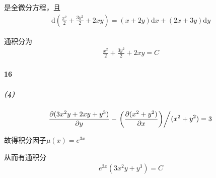 \documentclass[UTF8]{ctexart}
\begin{document}
    是全微分方程，且
    \begin{align*}
        \mathrm{d}(\frac{x^2}{2} + \frac{3y^2}{2} + 2xy) = (x+2y)\mathrm{d}x + (2x+3y)\mathrm{d}y
    \end{align*}

    通积分为
    \begin{align*}
        \frac{x^2}{2} + \frac{3y^2}{2} + 2xy = C
    \end{align*}

    \paragraph*{16}
    \subparagraph*{(4)}
    \begin{align*}
        \frac{\partial (3x^2y+2xy+y^3)}{\partial y} - 
        \left. \left(\frac{\partial (x^2+y^2)}{\partial x} \right)\middle/ (x^2+y^2) = 3 \right.
    \end{align*}
    
    故得积分因子$\mu (x) = e^{3x}$

    从而有通积分
    \begin{align*}
        e^{3x}(3x^2y+y^3) = C
    \end{align*}
\end{document}
